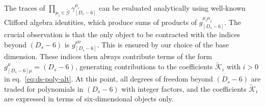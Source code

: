 The traces of $\prod_{\mu_i\in\tilde{\mathcal{G}}}\gamma^{\mu_i}_{[D_s-6]}$ can be 
evaluated analytically using well-known Clifford algebra identities,
which produce sums of products of $g^{\mu_i\mu_j}_{[D_s-6]}$.
%
The crucial observation is that the only object to be contracted with the indices beyond 
$(D_s-6)$ is $g^{\mu\nu}_{[D_s-6]}$.
This is ensured by our choice of the base dimension.
These indices then always contribute terms of the form $g^\mu_{[D_s-6]\mu} = (D_s-6)$, 
generating contributions to the coefficients $\tilde{\mathcal{K}}_i$ with $i>0$ 
in eq.~\eqref{eq:ds-poly-alt}. At this point, all degrees of freedom beyond $(D_s-6)$
are traded for polynomials in $(D_s-6)$ with integer factors, and the coefficients
$\tilde{\mathcal{K}}_i$ are expressed in terms of six-dimensional objects only.


